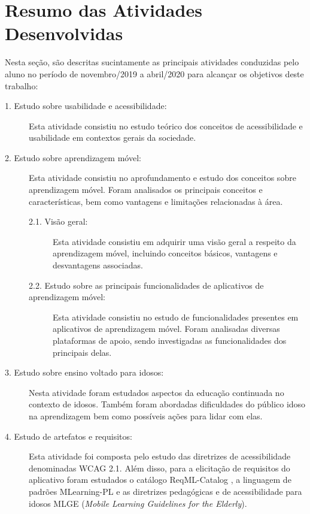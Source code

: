 \chapter{Resumo das Atividades Desenvolvidas} \label{sec:resumo_ativ}
Nesta seção, são descritas sucintamente as principais atividades conduzidas pelo aluno no período de novembro/2019 a abril/2020 para alcançar os objetivos deste trabalho:

\begin{description}
\item[1. Estudo sobre usabilidade e acessibilidade:]
Esta atividade consistiu no estudo teórico dos conceitos de acessibilidade e usabilidade em contextos gerais da sociedade.

\item[2. Estudo sobre aprendizagem móvel:] Esta atividade consistiu no aprofundamento e estudo dos conceitos sobre aprendizagem móvel. Foram analisados os principais conceitos e características, bem como vantagens e limitações relacionadas à área. 

\begin{description}
    \item[2.1. Visão geral:]
    Esta atividade consistiu em adquirir uma visão geral a respeito da aprendizagem móvel, incluindo conceitos básicos, vantagens e desvantagens associadas.
    
    \item[2.2. Estudo sobre as principais funcionalidades de aplicativos de aprendizagem móvel:]
    Esta atividade consistiu no estudo de funcionalidades presentes em aplicativos de aprendizagem móvel. Foram analisadas diversas plataformas de apoio, sendo investigadas as funcionalidades dos principais delas.
\end{description}

\item[3. Estudo sobre ensino voltado para idosos:] Nesta atividade foram estudados aspectos da educação continuada no contexto de idosos. Também foram abordadas dificuldades do público idoso na aprendizagem bem como possíveis ações para lidar com elas.

\item[4. Estudo de artefatos e requisitos:]
Esta atividade foi composta pelo estudo das diretrizes de acessibilidade denominadas WCAG 2.1. Além disso, para a elicitação de requisitos do aplicativo foram estudados o catálogo ReqML-Catalog \citep{soad2017reqml}, a linguagem de padrões MLearning-PL \citep{Fioravanti2017_plop} e as diretrizes pedagógicas e de acessibilidade para idosos MLGE (\textit{Mobile Learning Guidelines for the Elderly}).


\end{description}
